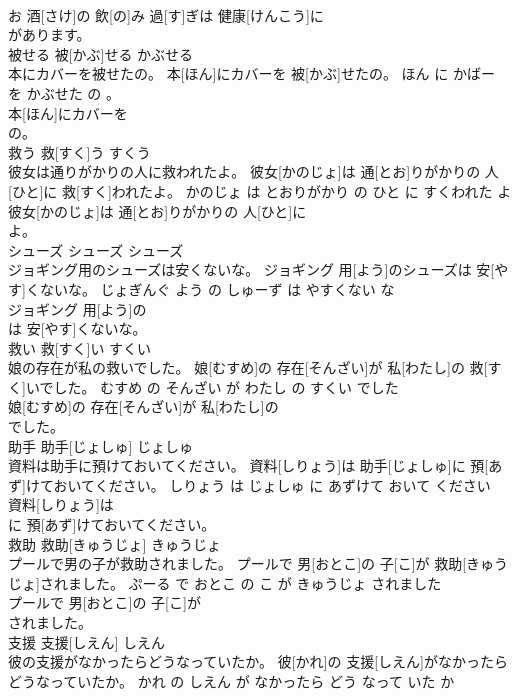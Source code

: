 \documentclass[8pt]{extreport}
\begin{document}
\begin{CJK}{UTF8}{min}
\\	お 酒[さけ]の 飲[の]み 過[す]ぎは 健康[けんこう]に
\\	があります。			
\\	被せる	被[かぶ]せる	かぶせる	
\\	本にカバーを被せたの。	本[ほん]にカバーを 被[かぶ]せたの。	ほん に かばー を かぶせた の 。	
\\	本[ほん]にカバーを
\\	の。			
\\	救う	救[すく]う	すくう	
\\	彼女は通りがかりの人に救われたよ。	彼女[かのじょ]は 通[とお]りがかりの 人[ひと]に 救[すく]われたよ。	かのじょ は とおりがかり の ひと に すくわれた よ	
\\	彼女[かのじょ]は 通[とお]りがかりの 人[ひと]に
\\	よ。			
\\	シューズ	シューズ	シューズ	
\\	ジョギング用のシューズは安くないな。	ジョギング 用[よう]のシューズは 安[やす]くないな。	じょぎんぐ よう の しゅーず は やすくない な	
\\	ジョギング 用[よう]の
\\	は 安[やす]くないな。			
\\	救い	救[すく]い	すくい	
\\	娘の存在が私の救いでした。	娘[むすめ]の 存在[そんざい]が 私[わたし]の 救[すく]いでした。	むすめ の そんざい が わたし の すくい でした	
\\	娘[むすめ]の 存在[そんざい]が 私[わたし]の
\\	でした。			
\\	助手	助手[じょしゅ]	じょしゅ	
\\	資料は助手に預けておいてください。	資料[しりょう]は 助手[じょしゅ]に 預[あず]けておいてください。	しりょう は じょしゅ に あずけて おいて ください	
\\	資料[しりょう]は
\\	に 預[あず]けておいてください。			
\\	救助	救助[きゅうじょ]	きゅうじょ	
\\	プールで男の子が救助されました。	プールで 男[おとこ]の 子[こ]が 救助[きゅうじょ]されました。	ぷーる で おとこ の こ が きゅうじょ されました	
\\	プールで 男[おとこ]の 子[こ]が
\\	されました。			
\\	支援	支援[しえん]	しえん	
\\	彼の支援がなかったらどうなっていたか。	彼[かれ]の 支援[しえん]がなかったらどうなっていたか。	かれ の しえん が なかったら どう なって いた か	

\end{CJK}
\end{document}
